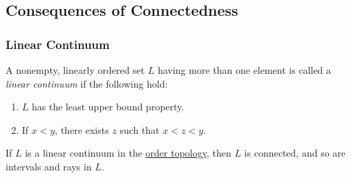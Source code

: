 \subsection{Consequences of Connectedness}\label{realconnectedness}

\subsubsection{Linear Continuum}\label{linearcontinuum}
A nonempty, linearly ordered set $L$ having more than one element is called a \emph{linear continuum} if the following hold:
\begin{enumerate}
\item $L$ has the least upper bound property.
\item If $x < y$, there exists $z$ such that $x < z < y$.
\end{enumerate}

\begin{theorem}
If $L$ is a linear continuum in the \hyperref[ordertopology]{order topology}, then $L$ is connected, and so are intervals and rays in $L$.
\end{theorem}

